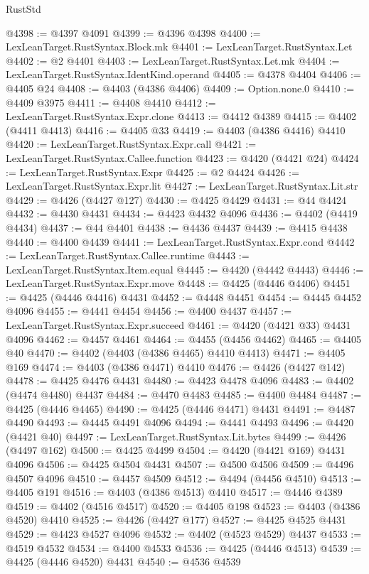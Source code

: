 \begin{lexlean}{RustStd}
\begin{coremodule}
@4398 := @4397 @4091
@4399 := @4396 @4398
@4400 := LexLeanTarget.RustSyntax.Block.mk
@4401 := LexLeanTarget.RustSyntax.Let
@4402 := @2 @4401
@4403 := LexLeanTarget.RustSyntax.Let.mk
@4404 := LexLeanTarget.RustSyntax.IdentKind.operand
@4405 := @4378 @4404
@4406 := @4405 @24
@4408 := @4403 (@4386 @4406)
@4409 := Option.none.{0}
@4410 := @4409 @3975
@4411 := @4408 @4410
@4412 := LexLeanTarget.RustSyntax.Expr.clone
@4413 := @4412 @4389
@4415 := @4402 (@4411 @4413)
@4416 := @4405 @33
@4419 := @4403 (@4386 @4416) @4410
@4420 := LexLeanTarget.RustSyntax.Expr.call
@4421 := LexLeanTarget.RustSyntax.Callee.function
@4423 := @4420 (@4421 @24)
@4424 := LexLeanTarget.RustSyntax.Expr
@4425 := @2 @4424
@4426 := LexLeanTarget.RustSyntax.Expr.lit
@4427 := LexLeanTarget.RustSyntax.Lit.str
@4429 := @4426 (@4427 @127)
@4430 := @4425 @4429
@4431 := @44 @4424
@4432 := @4430 @4431
@4434 := @4423 @4432 @4096
@4436 := @4402 (@4419 @4434)
@4437 := @44 @4401
@4438 := @4436 @4437
@4439 := @4415 @4438
@4440 := @4400 @4439
@4441 := LexLeanTarget.RustSyntax.Expr.cond
@4442 := LexLeanTarget.RustSyntax.Callee.runtime
@4443 := LexLeanTarget.RustSyntax.Item.equal
@4445 := @4420 (@4442 @4443)
@4446 := LexLeanTarget.RustSyntax.Expr.move
@4448 := @4425 (@4446 @4406)
@4451 := @4425 (@4446 @4416) @4431
@4452 := @4448 @4451
@4454 := @4445 @4452 @4096
@4455 := @4441 @4454
@4456 := @4400 @4437
@4457 := LexLeanTarget.RustSyntax.Expr.succeed
@4461 := @4420 (@4421 @33) @4431 @4096
@4462 := @4457 @4461
@4464 := @4455 (@4456 @4462)
@4465 := @4405 @40
@4470 := @4402 (@4403 (@4386 @4465) @4410 @4413)
@4471 := @4405 @169
@4474 := @4403 (@4386 @4471) @4410
@4476 := @4426 (@4427 @142)
@4478 := @4425 @4476 @4431
@4480 := @4423 @4478 @4096
@4483 := @4402 (@4474 @4480) @4437
@4484 := @4470 @4483
@4485 := @4400 @4484
@4487 := @4425 (@4446 @4465)
@4490 := @4425 (@4446 @4471) @4431
@4491 := @4487 @4490
@4493 := @4445 @4491 @4096
@4494 := @4441 @4493
@4496 := @4420 (@4421 @40)
@4497 := LexLeanTarget.RustSyntax.Lit.bytes
@4499 := @4426 (@4497 @162)
@4500 := @4425 @4499
@4504 := @4420 (@4421 @169) @4431 @4096
@4506 := @4425 @4504 @4431
@4507 := @4500 @4506
@4509 := @4496 @4507 @4096
@4510 := @4457 @4509
@4512 := @4494 (@4456 @4510)
@4513 := @4405 @191
@4516 := @4403 (@4386 @4513) @4410
@4517 := @4446 @4389
@4519 := @4402 (@4516 @4517)
@4520 := @4405 @198
@4523 := @4403 (@4386 @4520) @4410
@4525 := @4426 (@4427 @177)
@4527 := @4425 @4525 @4431
@4529 := @4423 @4527 @4096
@4532 := @4402 (@4523 @4529) @4437
@4533 := @4519 @4532
@4534 := @4400 @4533
@4536 := @4425 (@4446 @4513)
@4539 := @4425 (@4446 @4520) @4431
@4540 := @4536 @4539

\end{coremodule}
\end{lexlean}
